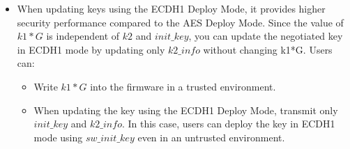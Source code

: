 \documentclass[main\_\_EN.tex]{subfiles}
\begin{document}
\begin{itemize}
    \begin{itemize}
        \item If using \begin{math}init\_key\end{math} stored in EFUSE\_KM\_INIT\_KEY eFuse block, \begin{math}k2\_info\end{math} and \begin{math}k1*G\end{math} may be transmitted in an untrusted environment. However, this requires to locally retain the \begin{math}init\_key\end{math} that was written to EFUSE\_KM\_INIT\_KEY eFuse block at the first time.
        \item If using \begin{math}sw\_init\_key\end{math}, the transmission of \begin{math}sw\_init\_key\end{math}, \begin{math}k2\_info\end{math}, and \begin{math}k1*G\end{math} must occur in a trusted environment.
    \end{itemize}
    \item When updating keys using the ECDH1 Deploy Mode, it provides higher security performance compared to the AES Deploy Mode. Since the value of \begin{math}k1*G\end{math} is independent of \begin{math}k2\end{math} and \begin{math}init\_key\end{math}, you can update the negotiated key in ECDH1 mode by updating only \begin{math}k2\_info\end{math} without changing k1*G. Users can:
    \begin{itemize}
        \item Write \begin{math}k1*G\end{math} into the firmware in a trusted environment.
        \item When updating the key using the ECDH1 Deploy Mode, transmit only \begin{math}init\_key\end{math} and \begin{math}k2\_info\end{math}. In this case, users can deploy the key in ECDH1 mode using \begin{math}sw\_init\_key\end{math} even in an untrusted environment.
    \end{itemize}
\end{itemize}
\end{document}
